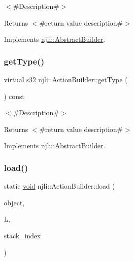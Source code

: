 $<$\#\+Description\#$>$

\begin{DoxyReturn}{Returns}
$<$\#return value description\#$>$ 
\end{DoxyReturn}


Implements \mbox{\hyperlink{classnjli_1_1_abstract_builder_a0f2d344fcf697b167f4f2b1122b5fb33}{njli\+::\+Abstract\+Builder}}.

\mbox{\label{classnjli_1_1_action_builder_afbc316d229d1cc330b0bc432eefbf5d9}} 
\subsubsection{\texorpdfstring{get\+Type()}{getType()}}
{\footnotesize\ttfamily virtual \mbox{\hyperlink{_util_8h_aa62c75d314a0d1f37f79c4b73b2292e2}{s32}} njli\+::\+Action\+Builder\+::get\+Type (\begin{DoxyParamCaption}{ }\end{DoxyParamCaption}) const\hspace{0.3cm}{\ttfamily [virtual]}}

$<$\#\+Description\#$>$

\begin{DoxyReturn}{Returns}
$<$\#return value description\#$>$ 
\end{DoxyReturn}


Implements \mbox{\hyperlink{classnjli_1_1_abstract_builder_abb4a8161cd71be12807fe85864b67050}{njli\+::\+Abstract\+Builder}}.

\mbox{\label{classnjli_1_1_action_builder_a86ba01c9ee80e198442a46b3cd5f9d7f}} 
\subsubsection{\texorpdfstring{load()}{load()}}
{\footnotesize\ttfamily static \mbox{\hyperlink{_thread_8h_af1e856da2e658414cb2456cb6f7ebc66}{void}} njli\+::\+Action\+Builder\+::load (\begin{DoxyParamCaption}\item[{\mbox{\hyperlink{classnjli_1_1_action_builder}{Action\+Builder}} \&}]{object,  }\item[{lua\+\_\+\+State $\ast$}]{L,  }\item[{int}]{stack\+\_\+index }\end{DoxyParamCaption})\hspace{0.3cm}{\ttfamily [static]}}

